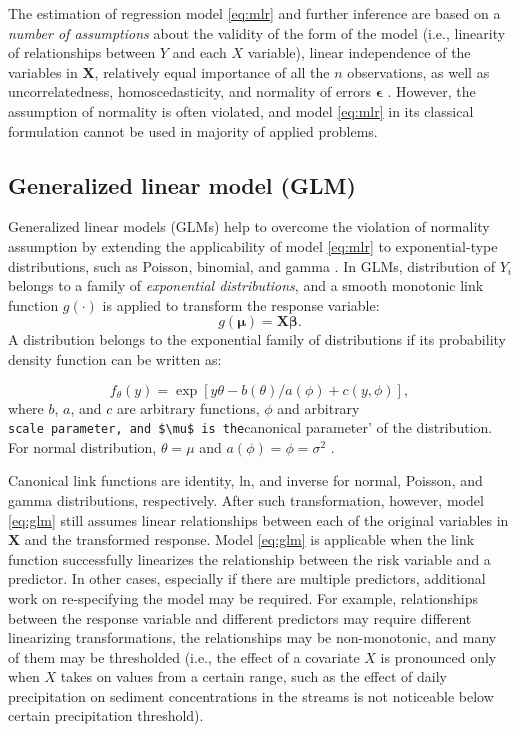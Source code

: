 \documentclass[
]{book}
\begin{document}
The estimation of regression model \eqref{eq:mlr} and further inference are based on a \emph{number of assumptions} about the validity of the form of the model (i.e., linearity of relationships between \(Y\) and each \(X\) variable), linear independence of the variables in \(\mathbf{X}\), relatively equal importance of all the \(n\) observations, as well as uncorrelatedness, homoscedasticity, and normality of errors \(\boldsymbol{\epsilon}\) \citep{Chatterjee:Hadi:2006}. However, the assumption of normality is often violated, and model \eqref{eq:mlr} in its classical formulation cannot be used in majority of applied problems.

\hypertarget{generalized-linear-model-glm}{%
\subsection{Generalized linear model (GLM)}\label{generalized-linear-model-glm}}

Generalized linear models (GLMs) help to overcome the violation of normality assumption by extending the applicability of model \eqref{eq:mlr} to exponential-type distributions, such as Poisson, binomial, and gamma \citep{Wood:2006book}. In GLMs, distribution of \(Y_i\) belongs to a family of \emph{exponential distributions}, and a smooth monotonic link function \(g(\cdot)\) is applied to transform the response variable:
\begin{equation}
    \label{eq:glm}
    g(\boldsymbol{\mu}) = \mathbf{X}\boldsymbol{\beta}.
\end{equation}
A distribution belongs to the exponential family of distributions if its probability density function can be written as:

\[f_{\theta}(y) = \exp[{y\theta - b(\theta)}/a(\phi) + c(y, \phi)],\]
where \(b\), \(a\), and \(c\) are arbitrary functions, \(\phi\) and arbitrary \texttt{scale\textquotesingle{}\ parameter,\ and\ \$\textbackslash{}mu\$\ is\ the}canonical parameter' of the distribution. For normal distribution, \(\theta = \mu\) and \(a(\phi) = \phi= \sigma^2\) \citep{Wood:2006book}.

Canonical link functions are identity, ln, and inverse for normal, Poisson, and gamma distributions, respectively. After such transformation, however, model \eqref{eq:glm} still assumes linear relationships between each of the original variables in \(\mathbf{X}\) and the transformed response. Model \eqref{eq:glm} is applicable when the link function successfully linearizes the relationship between the risk variable and a predictor. In other cases, especially if there are multiple predictors, additional work on re-specifying the model may be required. For example, relationships between the response variable and different predictors may require different linearizing transformations, the relationships may be non-monotonic, and many of them may be thresholded (i.e., the effect of a covariate \(X\) is pronounced only when \(X\) takes on values from a certain range, such as the effect of daily precipitation on sediment concentrations in the streams is not noticeable below certain precipitation threshold).
\end{document}
